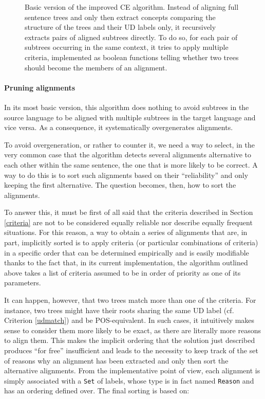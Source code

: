 \begin{figure}[H]
 \centering
 
 \caption[Basic version of the improved CE algorithm]{Basic version of the improved CE algorithm. Instead of aligning full sentence trees and only then extract concepts comparing the structure of the trees and their UD labels only, it recursively extracts pairs of aligned subtrees directly. To do so, for each pair of subtrees occurring in the same context, it tries to apply multiple criteria, implemented as boolean functions telling whether two trees should become the members of an alignment.}
 \label{extr}
\end{figure}

\paragraph{Pruning alignments} \label{pruning} 
In its most basic version, this algorithm does nothing to avoid subtrees in the source language to be aligned with multiple subtrees in the target language and vice versa. As a consequence, it systematically overgenerates alignments. \smallskip

To avoid overgeneration, or rather to counter it, we need a way to select, in the very common case that the algorithm detects several alignments alternative to each other within the same sentence, the one that is more likely to be correct. A way to do this is to sort such alignments based on their ``reliability'' and only keeping the first alternative. The question becomes, then, how to sort the alignments. \smallskip

To answer this, it must be first of all said that the criteria described in Section \ref{criteria} are not to be considered equally reliable nor describe equally frequent situations. For this reason, a way to obtain a series of alignments that are, in part, implicitly sorted is to apply criteria (or particular combinations of criteria) in a specific order that can be determined empirically and is easily modifiable thanks to the fact that, in its current implementation, the algorithm outlined above takes a list of criteria assumed to be in order of priority as one of its parameters. \smallskip

It can happen, however, that two trees match more than one of the criteria. For instance, two trees might have their roots sharing the same UD label (cf. Criterion \ref{udmatch}) and be POS-equivalent. In such cases, it intuitively makes sense to consider them more likely to be exact, as there are literally more reasons to align them. This makes the implicit ordering that the solution just described produces ``for free'' insufficient and leads to the necessity to keep track of the set of reasons why an alignment has been extracted and only then sort the alternative alignments. From the implementative point of view, each alignment is simply associated with a \texttt{Set} of labels, whose type is in fact named \texttt{Reason} and has an ordering defined over. The final sorting is based on:\smallskip

